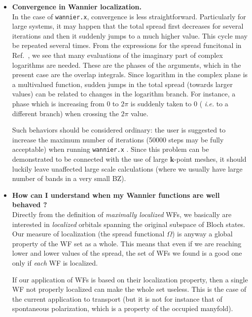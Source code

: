 \begin{itemize}
\item   {\bf Convergence in Wannier localization.} \\
        In the case of {\tt wannier.x}, convergence is less straightforward.
        Particularly for large systems, it may happen that the total spread first 
        decreases for several iterations and then it suddenly jumps to a much higher
        value.  This cycle may be repeated several times.
        From the expressions for the spread funcitonal in Ref.~\cite{nicola}, we see that
        many evaluations of the imaginary part of complex logarithms are needed. 
        These are the phases of the arguments, which in the present case are the overlap
        integrals. Since logarithm in the complex plane
        is a multivalued function, sudden jumps in the total spread (towards larger
        values) can be related to changes in the logarithm branch. For instance, a phase
        which is increasing from $0$ to $2\pi$ is suddenly taken to 0 (
        {\it i.e.} to a different branch) when crossing the $2\pi$ value.

        Such behaviors should be considered ordinary: the user is suggested to increase
        the maximum number of iterations (50000 steps may be fully acceptable)
        when running {\tt wannier.x} . Since this problem can be demonstrated to be 
        connected with the use of
        large $\mathbf{k}$-point meshes, it should luckily leave unaffected large scale
        calculations (where we usually have large number of bands in a very small BZ).

\item   {\bf How can I understand when my Wannier functions are well behaved ?} \\
        Directly from the definition of {\it maximally localized} WFs, we basically
        are interested in {\it localized} orbitals spanning the original subspace
        of Bloch states. Our measure of localization (the spread functional $\Omega$)
        is anyway a global property of the WF set as a whole.
        This means that even if we are reaching lower and lower
        values of the spread, the set of WFs we found is a good one only if {\it each}
        WF is localized.

        If our application of WFs is based on their localization property, then
        a single WF not properly localized can make the whole set useless. This is
        the case of the current application to transport (but it is not
        for instance that of spontaneous polarization, which is a property of the 
        occupied manyfold).


\end{itemize}
